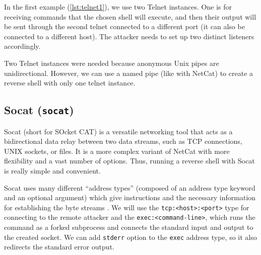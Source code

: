 In the first example (\cref{lst:telnet1}), we use two Telnet instances. One is for receiving commands that the chosen shell will execute, and then their output will be sent through the second telnet connected to a different port (it can also be connected to a different host). The attacker needs to set up two distinct listeners accordingly.



Two Telnet instances were needed because anonymous Unix pipes are unidirectional. However, we can use a named pipe (like with NetCat) to create a reverse shell with only one telnet instance.




\subsection{Socat (\texttt{socat})}


Socat (short for SOcket CAT) is a versatile networking tool that acts as a bidirectional data relay between two data streams, such as TCP connections, UNIX sockets, or files. It is a more complex variant of NetCat with more flexibility and a vast number of options. Thus, running a reverse shell with Socat is really simple and convenient.

Socat uses many different ``address types'' (composed of an address type keyword and an optional argument) which give instructions and the necessary information for establishing the byte streams \cite{socat-man}. We will use the \texttt{tcp:<host>:<port>} type for connecting to the remote attacker and the \texttt{exec:<command-line>}, which runs the command as a forked subprocess and connects the standard input and output to the created socket. We can add \texttt{stderr} option to the \texttt{exec} address type, so it also redirects the standard error output. \cite{socat-man}


